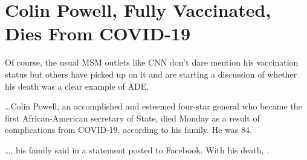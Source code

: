 \chapter{Colin Powell, Fully Vaccinated, Dies From COVID-19}

\begin{refsection}

Of course, the usual MSM outlets like CNN don't dare mention his vaccination status but others have picked up on it and are starting a discussion of whether his death was a clear example of ADE.


\begin{tcolorbox}[quote]

\dots{}Colin Powell, an accomplished and esteemed four-star general who became the first African-American secretary of State, died Monday as a result of complications from COVID-19, according to his family. He was 84.\textsuperscript{\cite{urlasdf098y}}

\end{tcolorbox}

\begin{tcolorbox}[quote]

\dots{}, his family said in a statement posted to Facebook. With his death, .\textsuperscript{\cite{urlasdf098y}}

\end{tcolorbox}

\printbibliography[heading=subbibliography]

\end{refsection}